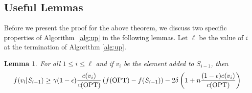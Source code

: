 \documentclass[10pt]{article} %
\newtheorem{lemma}[theorem]{Lemma}
\theoremstyle{remark}
\newcommand{\OPT}{{\rm OPT}}
\begin{document}
\subsection{Useful Lemmas}
Before we present the proof for the above theorem, we discuss two specific properties of Algorithm~\ref{alg:up}
in the following lemmas. Let $\ell$ be the value of $i$ at the termination of Algorithm \ref{alg:up}.

\begin{lemma}
\label{lem:marginal-gain-approx}
For all $1 \leq i \leq \ell$ and if $v_i$ be the element added to $S_{i-1}$, then
\[ 
f(v_i|S_{i-1}) \geq \gamma(1-\epsilon)\frac{c(v_i)}{c(\OPT)} \left( f(\OPT)-f(S_{i-1})\right) - 2\delta  \left( 1+n\frac{(1-\epsilon)c(v_i)}{ c(\OPT)} \right) 
\]
\end{lemma}
\end{document}
